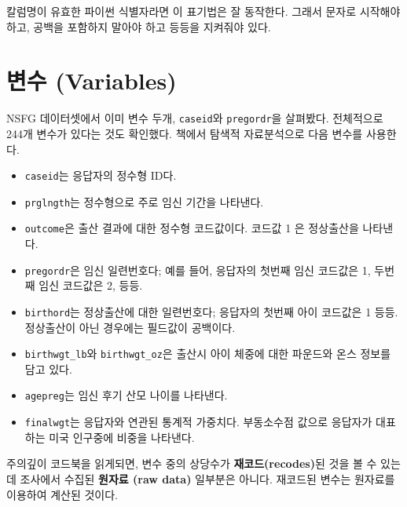 칼럼명이 유효한 파이썬 식별자라면 이 표기법은 잘 동작한다. 그래서 문자로 시작해야 하고, 공백을 포함하지 말아야 하고 등등을 지켜줘야 있다.  
\section{변수 (Variables)}

NSFG 데이터셋에서 이미 변수 두개, {\tt caseid}와 {\tt pregordr}을 살펴봤다. 전체적으로 244개 변수가 있다는 것도 확인했다. 책에서 탐색적 자료분석으로 다음 변수를 사용한다.

\begin{itemize}

\item {\tt caseid}는 응답자의 정수형 ID다.

\item {\tt prglngth}는 정수형으로 주로 임신 기간을 나타낸다.

\item {\tt outcome}은 출산 결과에 대한 정수형 코드값이다. 코드값 1 은 정상출산을 나타낸다.

\item {\tt pregordr}은 임신 일련번호다; 예를 들어, 응답자의 첫번째 임신 코드값은 1, 두번째 임신 코드값은 2, 등등.

\item {\tt birthord}는 정상출산에 대한 일련번호다; 응답자의 첫번째 아이 코드값은 1 등등. 정상출산이 아닌 경우에는 필드값이 공백이다. 


\item \verb"birthwgt_lb"와 \verb"birthwgt_oz"은 출산시 아이 체중에 대한 파운드와 온스 정보를 담고 있다.


\item {\tt agepreg}는 임신 후기 산모 나이를 나타낸다.

\item {\tt finalwgt}는 응답자와 연관된 통계적 가중치다. 부동소수점 값으로 응답자가 대표하는 미국 인구중에 비중을 나타낸다.


\end{itemize}

주의깊이 코드북을 읽게되면, 변수 중의 상당수가 {\bf 재코드(recodes)}된 것을 볼 수 있는데 조사에서 수집된 {\bf 원자료 (raw data)} 일부분은 아니다. 재코드된 변수는 원자료를 이용하여 계산된 것이다.

